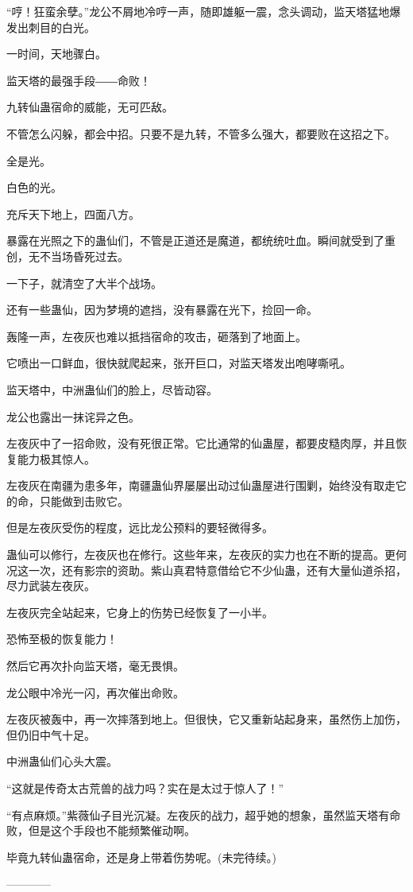 \begin{this_body}
“哼！狂蛮余孽。”龙公不屑地冷哼一声，随即雄躯一震，念头调动，监天塔猛地爆发出刺目的白光。

一时间，天地骤白。

监天塔的最强手段――命败！

九转仙蛊宿命的威能，无可匹敌。

不管怎么闪躲，都会中招。只要不是九转，不管多么强大，都要败在这招之下。

全是光。

白色的光。

充斥天下地上，四面八方。

暴露在光照之下的蛊仙们，不管是正道还是魔道，都统统吐血。瞬间就受到了重创，无不当场昏死过去。

一下子，就清空了大半个战场。

还有一些蛊仙，因为梦境的遮挡，没有暴露在光下，捡回一命。

轰隆一声，左夜灰也难以抵挡宿命的攻击，砸落到了地面上。

它喷出一口鲜血，很快就爬起来，张开巨口，对监天塔发出咆哮嘶吼。

监天塔中，中洲蛊仙们的脸上，尽皆动容。

龙公也露出一抹诧异之色。

左夜灰中了一招命败，没有死很正常。它比通常的仙蛊屋，都要皮糙肉厚，并且恢复能力极其惊人。

左夜灰在南疆为患多年，南疆蛊仙界屡屡出动过仙蛊屋进行围剿，始终没有取走它的命，只能做到击败它。

但是左夜灰受伤的程度，远比龙公预料的要轻微得多。

蛊仙可以修行，左夜灰也在修行。这些年来，左夜灰的实力也在不断的提高。更何况这一次，还有影宗的资助。紫山真君特意借给它不少仙蛊，还有大量仙道杀招，尽力武装左夜灰。

左夜灰完全站起来，它身上的伤势已经恢复了一小半。

恐怖至极的恢复能力！

然后它再次扑向监天塔，毫无畏惧。

龙公眼中冷光一闪，再次催出命败。

左夜灰被轰中，再一次摔落到地上。但很快，它又重新站起身来，虽然伤上加伤，但仍旧中气十足。

中洲蛊仙们心头大震。

“这就是传奇太古荒兽的战力吗？实在是太过于惊人了！”

“有点麻烦。”紫薇仙子目光沉凝。左夜灰的战力，超乎她的想象，虽然监天塔有命败，但是这个手段也不能频繁催动啊。

毕竟九转仙蛊宿命，还是身上带着伤势呢。(未完待续。)

------------

\end{this_body}

